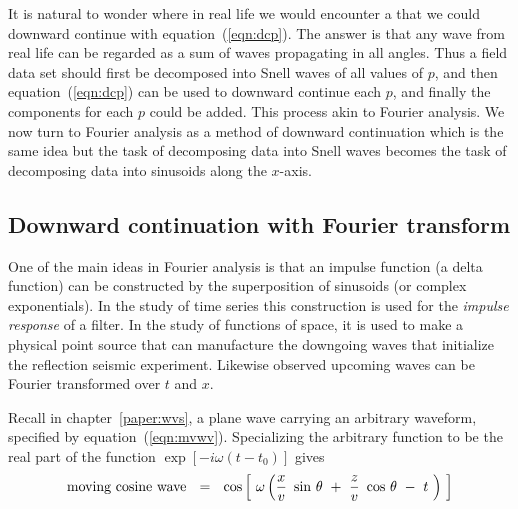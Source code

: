 \par
It is natural to wonder where in real life
we would encounter a  that we could downward continue
with equation~(\ref{eqn:dcp}).
The answer is that any wave from real life
can be regarded as a sum of waves propagating in all angles.
Thus a field data set should first be decomposed
into Snell waves of all values of $p$,
and then equation~(\ref{eqn:dcp})
can be used to downward continue each $p$,
and finally the components for each $p$ could be added.
This process akin to Fourier analysis.
We now turn to Fourier analysis as a method of downward continuation
which is the same idea but
the task of decomposing data into Snell waves
becomes the task of decomposing data into sinusoids along the $x$-axis.

\subsection{Downward continuation with Fourier transform}

\par
One of the main ideas in Fourier analysis
is that an impulse function
(a delta function)
can be constructed by the superposition of sinusoids
(or complex exponentials).
In the study of time series this construction is used for the
{\em 
impulse response
}
of a filter.
In the study of functions of space,
it is used to make a physical point source
that can manufacture the downgoing waves
that initialize the reflection seismic experiment.
Likewise observed upcoming waves can be Fourier transformed over $t$ and $x$.

\par
Recall in chapter~\ref{paper:wvs}, a plane wave carrying
an arbitrary waveform, specified by
equation~(\ref{eqn:mvwv}).
Specializing the arbitrary function to be
the real part of the function  $ \exp [ - i \omega (t-t_0 ) ]$  gives
\begin{equation}
\hbox{moving cosine wave} \ \ =\ \  \cos
\left[ \  \omega \left(  {x \over v }\  \sin \, \theta \ +\ 
{z \over v }\  \cos \, \theta \ -\  t \   \right) \   \right]
\label{eqn:2iei5}
\end{equation}

